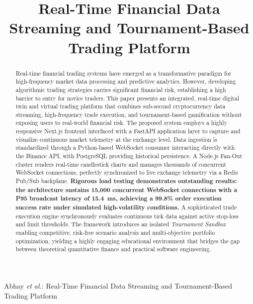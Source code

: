 \documentclass[conference]{IEEEtran}
\begin{document}
\title{Real-Time Financial Data Streaming and Tournament-Based Trading Platform}

\author{
}

%
{Abhay \MakeLowercase{\textit{et al.}}: Real-Time Financial Data Streaming and Tournament-Based Trading Platform}

\maketitle

\begin{abstract}
Real-time financial trading systems have emerged as a transformative paradigm for high-frequency market data processing and predictive analytics. However, developing algorithmic trading strategies carries significant financial risk, establishing a high barrier to entry for novice traders. This paper presents an integrated, real-time digital twin and virtual trading platform that combines sub-second cryptocurrency data streaming, high-frequency trade execution, and tournament-based gamification without exposing users to real-world financial risk. The proposed system employs a highly responsive Next.js frontend interfaced with a FastAPI application layer to capture and visualize continuous market telemetry at the exchange level. Data ingestion is standardized through a Python-based WebSocket consumer interacting directly with the Binance API, with PostgreSQL providing historical persistence. A Node.js Fan-Out cluster renders real-time candlestick charts and manages thousands of concurrent WebSocket connections, perfectly synchronized to live exchange telemetry via a Redis Pub/Sub backplane. \textbf{Rigorous load testing demonstrates outstanding results: the architecture sustains 15,000 concurrent WebSocket connections with a P95 broadcast latency of \textcolor{highlightgreen}{15.4~ms}, achieving a \textcolor{highlightgreen}{99.8\%} order execution success rate under simulated high-volatility conditions.} A sophisticated trade execution engine synchronously evaluates continuous tick data against active stop-loss and limit thresholds. The framework introduces an isolated \textit{Tournament Sandbox} enabling competitive, risk-free scenario analysis and multi-objective portfolio optimization, yielding a highly engaging educational environment that bridges the gap between theoretical quantitative finance and practical software engineering.
\end{abstract}
\end{document}
